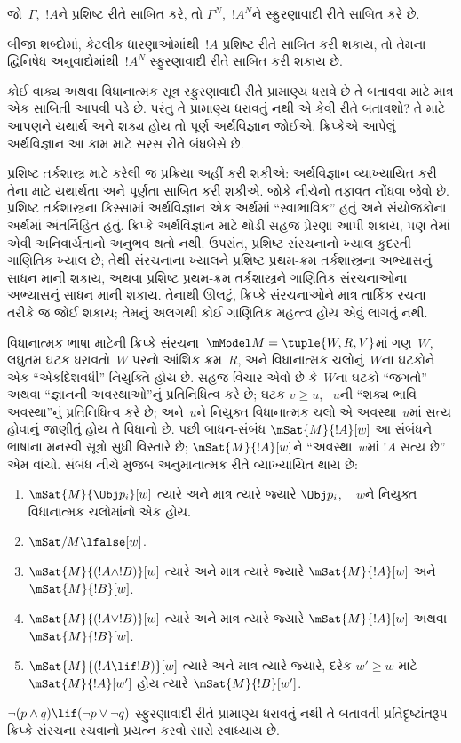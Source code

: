 \begin{thm}
જો~$\Gamma$,~$!A$ને પ્રશિષ્ટ રીતે સાબિત કરે, તો $\Gamma^N$,~$!A^N$ને
સ્ફુરણાવાદી રીતે સાબિત કરે છે.
\end{thm}

બીજા શબ્દોમાં, કેટલીક ધારણાઓમાંથી~$!A$ પ્રશિષ્ટ રીતે સાબિત કરી શકાય,
તો તેમના દ્વિનિષેધ અનુવાદોમાંથી~$!A^N$ સ્ફુરણાવાદી રીતે સાબિત કરી શકાય
છે.

કોઈ વાક્ય અથવા વિધાનાત્મક સૂત્ર સ્ફુરણાવાદી રીતે પ્રામાણ્ય ધરાવે
છે તે બતાવવા માટે માત્ર એક સાબિતી આપવી પડે છે. પરંતુ તે પ્રામાણ્ય
ધરાવતું નથી એ કેવી રીતે બતાવશો? તે માટે આપણને યથાર્થ અને શક્ય હોય તો
પૂર્ણ અર્થવિજ્ઞાન જોઈએ. ક્રિપ્કેએ આપેલું અર્થવિજ્ઞાન આ કામ માટે સરસ
રીતે બંધબેસે છે.

પ્રશિષ્ટ તર્કશાસ્ત્ર માટે કરેલી જ પ્રક્રિયા અહીં કરી શકીએ: અર્થવિજ્ઞાન
વ્યાખ્યાયિત કરી તેના માટે યથાર્થતા અને પૂર્ણતા સાબિત કરી શકીએ. જોકે
નીચેનો તફાવત નોંધવા જેવો છે. પ્રશિષ્ટ તર્કશાસ્ત્રના કિસ્સામાં
અર્થવિજ્ઞાન એક અર્થમાં ``સ્વાભાવિક'' હતું અને સંયોજકોના અર્થમાં
અંતર્નિહિત હતું. ક્રિપ્કે અર્થવિજ્ઞાન માટે થોડી સહજ પ્રેરણા આપી શકાય,
પણ તેમાં એવી અનિવાર્યતાનો અનુભવ થતો નથી. ઉપરાંત, પ્રશિષ્ટ
સંરચનાનો ખ્યાલ કુદરતી ગાણિતિક ખ્યાલ છે; તેથી સંરચનાના
ખ્યાલને પ્રશિષ્ટ પ્રથમ-ક્રમ તર્કશાસ્ત્રના અભ્યાસનું સાધન માની શકાય,
અથવા પ્રશિષ્ટ પ્રથમ-ક્રમ તર્કશાસ્ત્રને ગાણિતિક સંરચનાઓના
અભ્યાસનું સાધન માની શકાય. તેનાથી ઊલટું, ક્રિપ્કે સંરચનાઓને માત્ર
તાર્કિક રચના તરીકે જ જોઈ શકાય; તેમનું અલગથી કોઈ ગાણિતિક મહત્ત્વ હોય
એવું લાગતું નથી.

વિધાનાત્મક ભાષા માટેની ક્રિપ્કે સંરચના~$\mModel M = \tuple{W,
R, V}$માં ગણ~$W$, લઘુતમ ઘટક ધરાવતો~$W$ પરનો આંશિક ક્રમ~$R$,
અને વિધાનાત્મક ચલોનું~$W$ના ઘટકોને એક ``એકદિશવર્ધી'' નિયુક્તિ
હોય છે. સહજ વિચાર એવો છે કે~$W$ના ઘટકો ``જગતો'' અથવા
``જ્ઞાનની અવસ્થાઓ''નું પ્રતિનિધિત્વ કરે છે; ઘટક $v \geq u$,
~$u$ની ``શક્ય ભાવિ અવસ્થા''નું પ્રતિનિધિત્વ કરે છે; અને~$u$ને નિયુક્ત
વિધાનાત્મક ચલો એ અવસ્થા~$u$માં સત્ય હોવાનું જાણીતું હોય તે વિધાનો છે.
પછી બાધન-સંબંધ $\mSat{M}{!A}[w]$ આ સંબંધને ભાષાના મનસ્વી
સૂત્રો સુધી વિસ્તારે છે; $\mSat{M}{!A}[w]$ને ``અવસ્થા~$w$માં
$!A$ સત્ય છે'' એમ વાંચો. સંબંધ નીચે મુજબ અનુમાનાત્મક રીતે વ્યાખ્યાયિત
થાય છે:
\begin{enumerate}
\item $\mSat{M}{\Obj p_i}[w]$ ત્યારે અને માત્ર ત્યારે જ્યારે $\Obj p_i$,
  ~ $w$ને નિયુક્ત વિધાનાત્મક ચલોમાંનો એક હોય.
\item $\mSat/{M}{\lfalse}[w]$.
\item $\mSat{M}{(!A \land !B)}[w]$ ત્યારે અને માત્ર ત્યારે જ્યારે
  $\mSat{M}{!A}[w]$ અને $\mSat{M}{!B}[w]$.
\item $\mSat{M}{(!A \lor !B)}[w]$ ત્યારે અને માત્ર ત્યારે જ્યારે
  $\mSat{M}{!A}[w]$ અથવા $\mSat{M}{!B}[w]$.
\item $\mSat{M}{(!A \lif !B)}[w]$ ત્યારે અને માત્ર ત્યારે જ્યારે, દરેક
  $w' \geq w$ માટે $\mSat{M}{!A}[w']$ હોય ત્યારે $\mSat{M}{!B}[w']$.
\end{enumerate}
$\lnot (p \land q) \lif (\lnot p \lor \lnot q)$ સ્ફુરણાવાદી રીતે
પ્રામાણ્ય ધરાવતું નથી તે બતાવતી પ્રતિદૃષ્ટાંતરૂપ ક્રિપ્કે સંરચના
રચવાનો પ્રયત્ન કરવો સારો સ્વાધ્યાય છે.
\endgroup


